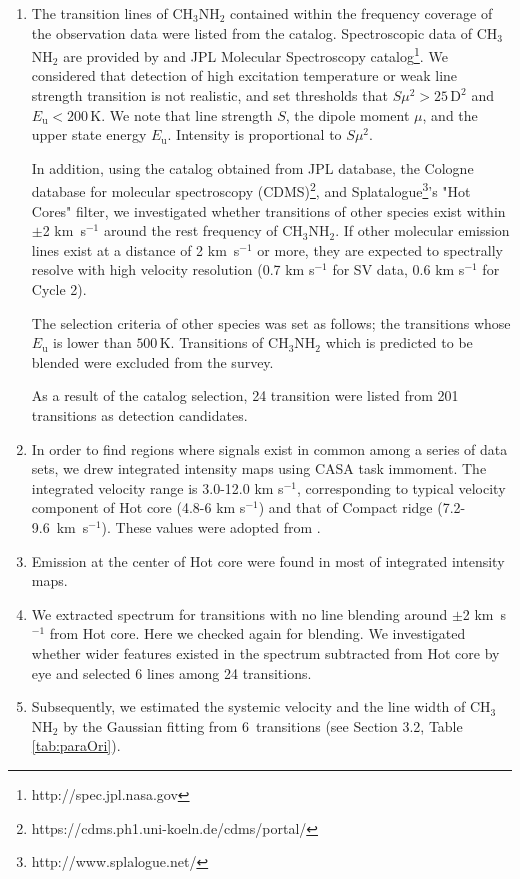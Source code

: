 \begin{enumerate}
\item The transition lines of CH$_3$NH$_2$ contained within the frequency coverage of the observation data were listed from the catalog. Spectroscopic data of CH$_3$NH$_2$ are provided by \citet{Motiyenko+2014} and JPL Molecular Spectroscopy catalog\footnote{http://spec.jpl.nasa.gov}.
We considered that detection of high excitation temperature or weak line strength transition 
is not realistic, and set thresholds that $S\mu^2 > 25\,\mathrm{D^2}$ and $E_{\mathrm{u}} < 200 \,\mathrm{K}$. We note that line strength $S$, the dipole moment $\mu$, and the upper state energy 
$E_{\mathrm{u}}$. Intensity is proportional to $S\mu^2$.

In addition, using the catalog obtained from JPL database, the Cologne database for molecular 
spectroscopy (CDMS)\footnote{https://cdms.ph1.uni-koeln.de/cdms/portal/}, 
and Splatalogue\footnote{http://www.splalogue.net/}'s "Hot Cores" filter, 
we investigated whether transitions of other species exist within $\pm$2 km~s$^{-1}$  
around the rest frequency of CH$_3$NH$_2$. 
If other molecular emission lines exist at a distance of 2 km~s$^{-1}$ or more, they are expected to spectrally resolve with high velocity resolution (0.7 km s$^{-1}$ for SV data, 0.6 km s$^{-1}$ for Cycle 2).


The selection criteria of other species was set as follows; 
the transitions whose $E_{\mathrm{u}}$ is lower than $500\, \mathrm{K}$.
Transitions of CH$_3$NH$_2$ which is predicted to be blended were excluded from the survey.

As a result of the catalog selection, 24 transition were listed from 201 transitions as detection candidates.

\item In order to find regions where signals exist in common among a series of data sets, 
we drew integrated intensity maps 
using CASA task {\sc immoment}. The integrated velocity range is 3.0-12.0 km s$^{-1}$, corresponding to
typical velocity component of Hot core (4.8-6 km s$^{-1}$) and that of Compact ridge 
(7.2-9.6~km~s$^{-1}$). These values were adopted from \citet{Feng+2015}.

\item Emission at the center of Hot core were found in most of integrated intensity maps. 

\item We extracted spectrum for transitions with no line blending around $\pm$2 km~s$^{-1}$ from Hot core. Here we checked again for blending. We investigated whether wider features existed 
in the spectrum subtracted from Hot core by eye and selected 6 lines among 24 transitions.

\item Subsequently, we estimated the systemic velocity and the line width of CH$_3$NH$_2$ 
by the Gaussian fitting from 6~transitions (see Section 3.2, Table \ref{tab:paraOri}).
\end{enumerate}
